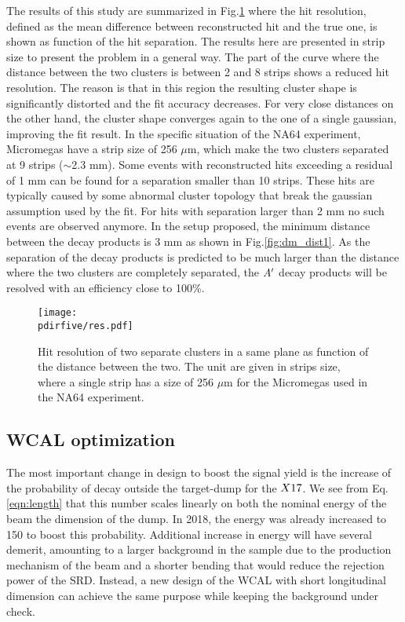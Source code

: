 The results of this study are summarized in Fig.\ref{fig:res-hit} where the hit resolution, defined as the mean difference between reconstructed hit and the true one, is shown as function of the hit separation. The results here are presented in strip size to present the problem in a general way. The part of the curve where the distance between the two clusters is between 2 and 8 strips shows a reduced hit resolution. The reason is that in this region the resulting cluster shape is significantly distorted and the fit accuracy decreases. For very close distances on the other hand, the cluster shape converges again to the one of a single gaussian, improving the fit result. In the specific situation of the NA64 experiment, Micromegas have a strip size of 256 $\mu$m, which make the two clusters separated at 9 strips ($\sim$2.3 mm). Some events with reconstructed hits exceeding a residual of 1 mm can be found for a separation smaller than 10 strips. These hits are typically caused by some abnormal cluster topology that break the gaussian assumption used by the fit. For hits with separation larger than 2 mm no such events are observed anymore. In the setup proposed, the minimum distance between the decay products is 3 mm as shown in Fig.\ref{fig:dm_dist1}. As the separation of the decay products is predicted to be much larger than the distance where the two clusters are completely separated, the $A'$ decay products will be resolved with an efficiency close to 100\%.

\begin{figure}[tbh!]
  \centering
  \texttt{[image: \\pdirfive/res.pdf]}
  \caption[hit resolution as function of the two cluster distance]{Hit resolution of two separate clusters in a same plane as function of the distance between the two. The unit are given in strips size, where a single strip has a size of 256 $\mu$m for the Micromegas used in the NA64 experiment.}
  \label{fig:res-hit}
\end{figure}

\subsection{WCAL optimization}
\label{ch5:sec:new-vismode-setup-wcal}

The most important change in design to boost the signal yield is the increase of the probability of decay outside the target-dump for the $X17$. We see from Eq.\ref{eqn:length} that this number scales linearly on both the nominal energy of the beam the dimension of the dump. In 2018, the energy was already increased to 150 \gev to boost this probability. Additional increase in energy will have several demerit, amounting to a larger background in the sample due to the production mechanism of the beam and a shorter bending that would reduce the rejection power of the SRD. Instead, a new design of the WCAL with short longitudinal dimension can achieve the same purpose while keeping the background under check.

